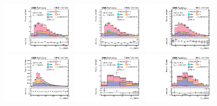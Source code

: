 \begin{figure}[ht]
    \begin{center}
        \includegraphics[width=0.32\textwidth]{figures/ch-10-results/mt_all_1_post_prelim-yes.pdf}
        \includegraphics[width=0.32\textwidth]{figures/ch-10-results/mt_all_2_post_prelim-yes.pdf}
        \includegraphics[width=0.32\textwidth]{figures/ch-10-results/mt_all_3_post_prelim-yes.pdf}\\
        \includegraphics[width=0.32\textwidth]{figures/ch-10-results/mt_all_4_post_prelim-yes.pdf}
        \includegraphics[width=0.32\textwidth]{figures/ch-10-results/mt_all_5_post_prelim-yes.pdf}
        \includegraphics[width=0.32\textwidth]{figures/ch-10-results/mt_all_6_post_prelim-yes.pdf}\\

\end{center}
\end{figure}
